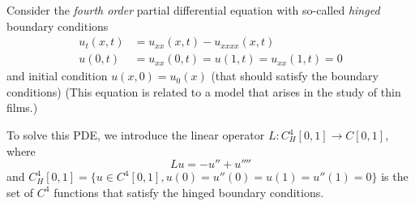 Consider the \emph{fourth order} partial differential equation with so-called \emph{hinged} boundary conditions
\begin{align*}
 u_t(x,t) &= u_{xx}(x,t) - u_{xxxx}(x,t)\\
u(0,t) &= u_{xx}(0,t) = u(1,t) = u_{xx}(1,t) = 0
\end{align*}
and initial condition $u(x,0) = u_0(x)$ (that should satisfy the boundary conditions)
(This equation is related to a model that arises in the study of thin films.)

      To solve this PDE, we introduce the linear
      operator $L: C^4_H[0,1] \to C[0,1]$, where 
      \[ Lu = -u'' + u''''\]
      and $ C^4_H[0,1] = \{ u \in C^4[0,1], u(0)=u''(0)=u(1)=u''(1)=0\}$
      is the set of $C^4$ functions that satisfy the hinged boundary conditions.

